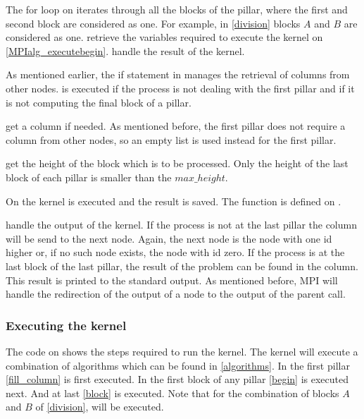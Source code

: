 The for loop on  iterates through all the blocks of the pillar, where the first and second block are considered as one.
For example, in \cref{division} blocks $A$ and $B$ are considered as one.
 retrieve the variables required to execute the kernel on \cref{MPIalg_executebegin}.
 handle the result of the kernel.

As mentioned earlier, the if statement in  manages the retrieval of columns from other nodes.
 is executed if the process is not dealing with the first pillar and if it is not computing the final block of a pillar.

 get a column if needed.
As mentioned before, the first pillar does not require a column from other nodes, so an empty list is used instead for the first pillar.

 get the height of the block which is to be processed.
Only the height of the last block of each pillar is smaller than the $max\_height$.

On  the kernel is executed and the result is saved.
The function is defined on .

 handle the output of the kernel.
If the process is not at the last pillar the column will be send to the next node.
Again, the next node is the node with one id higher or, if no such node exists, the node with id zero.
If the process is at the last block of the last pillar, the result of the problem can be found in the column.
This result is printed to the standard output.
As mentioned before, MPI will handle the redirection of the output of a node to the output of the parent call.

\subsubsection{Executing the kernel}
The code on  shows the steps required to run the kernel.
The kernel will execute a combination of algorithms which can be found in \cref{algorithms}.
In the first pillar \cref{fill_column} is first executed.
In the first block of any pillar \cref{begin} is executed next.
And at last \cref{block} is executed.
Note that for the combination of blocks $A$ and $B$ of \cref{division},  will be executed.

